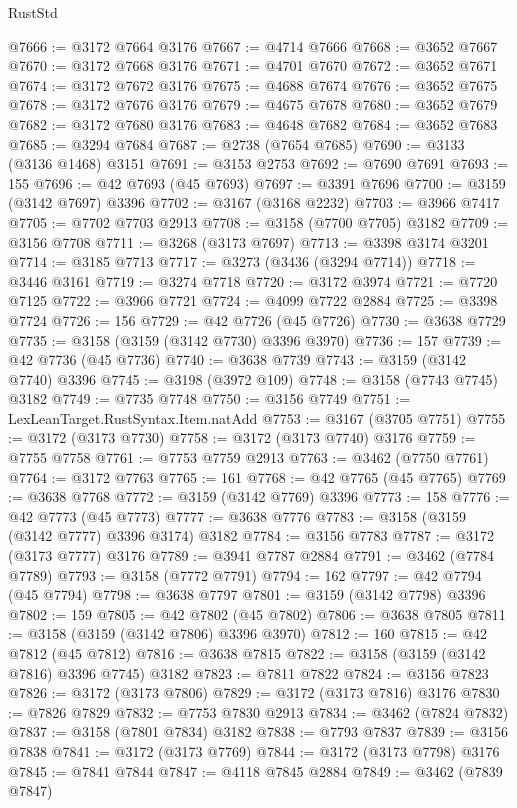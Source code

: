 \begin{lexlean}{RustStd}
\begin{coremodule}
@7666 := @3172 @7664 @3176
@7667 := @4714 @7666
@7668 := @3652 @7667
@7670 := @3172 @7668 @3176
@7671 := @4701 @7670
@7672 := @3652 @7671
@7674 := @3172 @7672 @3176
@7675 := @4688 @7674
@7676 := @3652 @7675
@7678 := @3172 @7676 @3176
@7679 := @4675 @7678
@7680 := @3652 @7679
@7682 := @3172 @7680 @3176
@7683 := @4648 @7682
@7684 := @3652 @7683
@7685 := @3294 @7684
@7687 := @2738 (@7654 @7685)
@7690 := @3133 (@3136 @1468) @3151
@7691 := @3153 @2753
@7692 := @7690 @7691
@7693 := 155
@7696 := @42 @7693 (@45 @7693)
@7697 := @3391 @7696
@7700 := @3159 (@3142 @7697) @3396
@7702 := @3167 (@3168 @2232)
@7703 := @3966 @7417
@7705 := @7702 @7703 @2913
@7708 := @3158 (@7700 @7705) @3182
@7709 := @3156 @7708
@7711 := @3268 (@3173 @7697)
@7713 := @3398 @3174 @3201
@7714 := @3185 @7713
@7717 := @3273 (@3436 (@3294 @7714))
@7718 := @3446 @3161
@7719 := @3274 @7718
@7720 := @3172 @3974
@7721 := @7720 @7125
@7722 := @3966 @7721
@7724 := @4099 @7722 @2884
@7725 := @3398 @7724
@7726 := 156
@7729 := @42 @7726 (@45 @7726)
@7730 := @3638 @7729
@7735 := @3158 (@3159 (@3142 @7730) @3396 @3970)
@7736 := 157
@7739 := @42 @7736 (@45 @7736)
@7740 := @3638 @7739
@7743 := @3159 (@3142 @7740) @3396
@7745 := @3198 (@3972 @109)
@7748 := @3158 (@7743 @7745) @3182
@7749 := @7735 @7748
@7750 := @3156 @7749
@7751 := LexLeanTarget.RustSyntax.Item.natAdd
@7753 := @3167 (@3705 @7751)
@7755 := @3172 (@3173 @7730)
@7758 := @3172 (@3173 @7740) @3176
@7759 := @7755 @7758
@7761 := @7753 @7759 @2913
@7763 := @3462 (@7750 @7761)
@7764 := @3172 @7763
@7765 := 161
@7768 := @42 @7765 (@45 @7765)
@7769 := @3638 @7768
@7772 := @3159 (@3142 @7769) @3396
@7773 := 158
@7776 := @42 @7773 (@45 @7773)
@7777 := @3638 @7776
@7783 := @3158 (@3159 (@3142 @7777) @3396 @3174) @3182
@7784 := @3156 @7783
@7787 := @3172 (@3173 @7777) @3176
@7789 := @3941 @7787 @2884
@7791 := @3462 (@7784 @7789)
@7793 := @3158 (@7772 @7791)
@7794 := 162
@7797 := @42 @7794 (@45 @7794)
@7798 := @3638 @7797
@7801 := @3159 (@3142 @7798) @3396
@7802 := 159
@7805 := @42 @7802 (@45 @7802)
@7806 := @3638 @7805
@7811 := @3158 (@3159 (@3142 @7806) @3396 @3970)
@7812 := 160
@7815 := @42 @7812 (@45 @7812)
@7816 := @3638 @7815
@7822 := @3158 (@3159 (@3142 @7816) @3396 @7745) @3182
@7823 := @7811 @7822
@7824 := @3156 @7823
@7826 := @3172 (@3173 @7806)
@7829 := @3172 (@3173 @7816) @3176
@7830 := @7826 @7829
@7832 := @7753 @7830 @2913
@7834 := @3462 (@7824 @7832)
@7837 := @3158 (@7801 @7834) @3182
@7838 := @7793 @7837
@7839 := @3156 @7838
@7841 := @3172 (@3173 @7769)
@7844 := @3172 (@3173 @7798) @3176
@7845 := @7841 @7844
@7847 := @4118 @7845 @2884
@7849 := @3462 (@7839 @7847)

\end{coremodule}
\end{lexlean}
